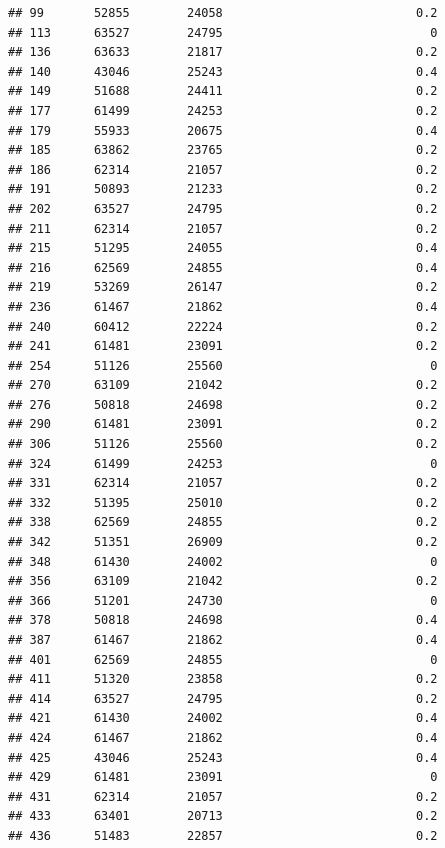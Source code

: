 \documentclass[
]{article}
\begin{document}
\begin{verbatim}
## 99       52855        24058                           0.2
## 113      63527        24795                             0
## 136      63633        21817                           0.2
## 140      43046        25243                           0.4
## 149      51688        24411                           0.2
## 177      61499        24253                           0.2
## 179      55933        20675                           0.4
## 185      63862        23765                           0.2
## 186      62314        21057                           0.2
## 191      50893        21233                           0.2
## 202      63527        24795                           0.2
## 211      62314        21057                           0.2
## 215      51295        24055                           0.4
## 216      62569        24855                           0.4
## 219      53269        26147                           0.2
## 236      61467        21862                           0.4
## 240      60412        22224                           0.2
## 241      61481        23091                           0.2
## 254      51126        25560                             0
## 270      63109        21042                           0.2
## 276      50818        24698                           0.2
## 290      61481        23091                           0.2
## 306      51126        25560                           0.2
## 324      61499        24253                             0
## 331      62314        21057                           0.2
## 332      51395        25010                           0.2
## 338      62569        24855                           0.2
## 342      51351        26909                           0.2
## 348      61430        24002                             0
## 356      63109        21042                           0.2
## 366      51201        24730                             0
## 378      50818        24698                           0.4
## 387      61467        21862                           0.4
## 401      62569        24855                             0
## 411      51320        23858                           0.2
## 414      63527        24795                           0.2
## 421      61430        24002                           0.4
## 424      61467        21862                           0.4
## 425      43046        25243                           0.4
## 429      61481        23091                             0
## 431      62314        21057                           0.2
## 433      63401        20713                           0.2
## 436      51483        22857                           0.2

\end{verbatim}
\end{document}
